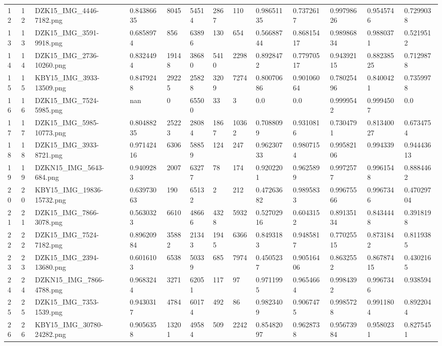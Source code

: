 \documentclass[11pt, a4paper, twoside]{report}
\begin{document}
\begin{longtable}[c]{@{}lllllllllllll@{}}
12 & 12 & DZK15\_IMG\_4446-7182.png & 0.84386635 & 8045 & 54514 & 2867 & 110 & 0.98651135 & 0.7372617 & 0.99798626 & 0.9545746 & 0.7299038 \\
13 & 13 & DZK15\_IMG\_3591-9918.png & 0.6858974 & 856 & 63896 & 130 & 654 & 0.56688744 & 0.86815417 & 0.98986834 & 0.9880371 & 0.5219512 \\
14 & 14 & DZK15\_IMG\_2736-10260.png & 0.8324494 & 19148 & 38680 & 5410 & 2298 & 0.8928472 & 0.77970517 & 0.94392115 & 0.88238525 & 0.7129878 \\
15 & 15 & KBY15\_IMG\_3933-13509.png & 0.8479248 & 29225 & 25828 & 3209 & 7274 & 0.80070686 & 0.90106064 & 0.78025496 & 0.8400421 & 0.7359978 \\
16 & 16 & DZK15\_IMG\_7524-5985.png & nan & 0 & 65500 & 33 & 3 & 0.0 & 0.0 & 0.9999542 & 0.9994507 & 0.0 \\
17 & 17 & DZK15\_IMG\_5985-10773.png & 0.80488235 & 25223 & 28084 & 1867 & 10362 & 0.7088099 & 0.9310816 & 0.7304791 & 0.81340027 & 0.6734754 \\
18 & 18 & DZK15\_IMG\_3933-8721.png & 0.97142416 & 6306 & 58859 & 124 & 247 & 0.96230733 & 0.9807154 & 0.99582106 & 0.994339 & 0.94443613 \\
19 & 19 & DZKN15\_IMG\_5643-684.png & 0.9409283 & 2007 & 63277 & 78 & 174 & 0.9202201 & 0.9625899 & 0.9972577 & 0.9961548 & 0.8884462 \\
20 & 20 & KBY15\_IMG\_19836-15732.png & 0.63973063 & 190 & 65132 & 2 & 212 & 0.47263682 & 0.9895833 & 0.99675566 & 0.9967346 & 0.47029704 \\
21 & 21 & DZK15\_IMG\_7866-3078.png & 0.5630323 & 6610 & 48666 & 4328 & 5932 & 0.52702916 & 0.6043152 & 0.89135134 & 0.8434448 & 0.3918198 \\
22 & 22 & DZK15\_IMG\_7524-7182.png & 0.89620984 & 35882 & 21343 & 1945 & 6366 & 0.8493183 & 0.9485817 & 0.77025515 & 0.8731842 & 0.8119385 \\
23 & 23 & DZK15\_IMG\_2394-13680.png & 0.6016103 & 6538 & 50339 & 685 & 7974 & 0.4505237 & 0.90516406 & 0.8632552 & 0.86787415 & 0.4302165 \\
24 & 24 & DZKN15\_IMG\_7866-4788.png & 0.9683244 & 3271 & 62051 & 117 & 97 & 0.9711995 & 0.9654664 & 0.9984392 & 0.9967346 & 0.938594 \\
25 & 25 & DZK15\_IMG\_7353-1539.png & 0.9430317 & 4784 & 60174 & 492 & 86 & 0.9823409 & 0.9067475 & 0.9985728 & 0.9911804 & 0.8922044 \\
26 & 26 & KBY15\_IMG\_30780-24282.png & 0.9056358 & 13201 & 49584 & 509 & 2242 & 0.85482097 & 0.9628738 & 0.95673984 & 0.9580231 & 0.8275451 \\

\end{longtable}
\end{document}
